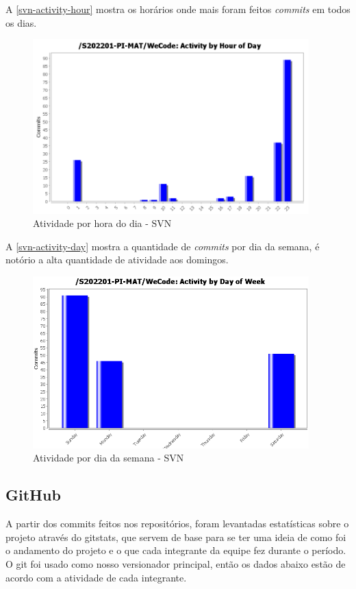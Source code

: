 A \autoref{svn-activity-hour} mostra os horários onde mais foram feitos \emph{commits} em todos os dias.
\begin{figure}[H]
	\centering
	\caption{\label{svn-activity-hour}Atividade por hora do dia - SVN}
	\includegraphics[width=0.95\textwidth]{../imagens/stats/svn-activity-hour.png}
\end{figure}

A \autoref{svn-activity-day} mostra a quantidade de \emph{commits} por dia da semana, é notório a alta quantidade de atividade aos domingos.
\begin{figure}[H]
	\centering
	\caption{\label{svn-activity-day}Atividade por dia da semana - SVN}
	\includegraphics[width=0.95\textwidth]{../imagens/stats/svn-activity-day.png}
\end{figure}

\subsection{GitHub}
A partir dos commits feitos nos repositórios, foram levantadas estatísticas sobre o projeto através do \gls{gitstats}, que servem de base para se ter uma ideia de como foi o andamento do projeto e o que cada integrante da equipe fez durante o período.
O \gls{git} foi usado como nosso versionador principal, então os dados abaixo estão de acordo com a atividade de cada integrante.

